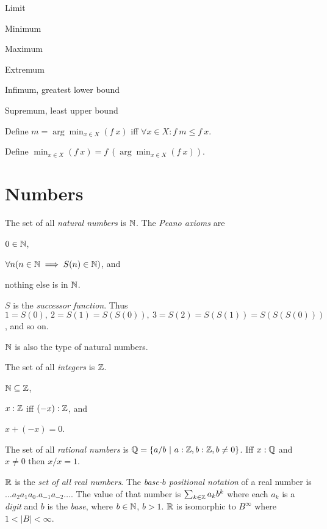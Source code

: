 Limit

Minimum

Maximum

Extremum

Infimum, greatest lower bound

Supremum, least upper bound

%
Define \(m = \arg\min_{x \in X}(f~x)\) iff \(\forall x \in X : f~m \le f~x\).

%
Define \(\min_{x \in X}(f~x) = f~(\arg\min_{x \in X}(f~x))\).

\section{Numbers}

%
The set of all \emph{natural numbers} is \(\mathbb{N}\).
%
The \emph{Peano axioms} are
\begin{enumerate*}[label={(\arabic*)}]
    \item \(0 \in \mathbb{N}\),
    \item \(\forall n (n \in \mathbb{N} \implies S(n) \in \mathbb{N})\), and
    \item nothing else is in \(\mathbb{N}\).
\end{enumerate*}
%
\(S\) is the \emph{successor function}.
Thus \(1 = S(0), ~ 2 = S(1) = S(S(0)), ~ 3 = S(2) = S(S(1)) = S(S(S(0)))\), and so on.

\(\mathbb{N}\) is also the type of natural numbers.

%
%
The set of all \emph{integers} is \(\mathbb{Z}\).
\begin{enumerate*}[label={(\arabic*)}]
    \item \(\mathbb{N} \subseteq \mathbb{Z}\),
    \item \(x : \mathbb{Z}\) iff \((-x) : \mathbb{Z}\), and
    \item \(x + (-x) = 0\).
\end{enumerate*}

%
%
The set of all \emph{rational numbers} is
\(\mathbb{Q} = \{ a/b ~|~ a : \mathbb{Z}, b : \mathbb{Z}, b \neq 0 \}\).
Iff \(x : \mathbb{Q}\) and \(x \neq 0\) then \(x/x = 1\).

%
%
%
%
\(\mathbb{R}\) is the \emph{set of all real numbers}.
The \emph{base-\(b\) positional notation} of a real number
is \(\ldots a_2 a_1 a_0 . a_{-1} a_{-2} \ldots\).
The value of that number is \(\sum_{k \in \mathbb{Z}} a_k b^k\)
where each \(a_k\) is a \emph{digit} and \(b\) is the \emph{base},
where \(b \in \mathbb{N}\), \(b > 1\).
\(\mathbb{R}\) is isomorphic to \(B^\infty\) where \(1 < |B| < \infty\).

